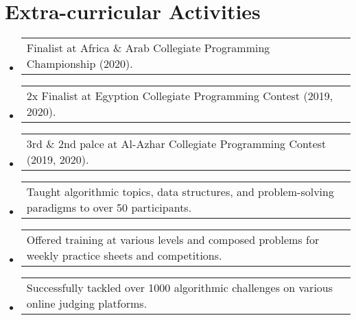 \documentclass[letterpaper, 11pt]{article}
\makeatletter
\newcommand{\extracurricularactivity}[3] {
	\vspace{1pt}\item
  \begin{tabular*}{0.97\textwidth}[t]{l@{\extracolsep{\fill}}r}
		#1 & \href{#2}{\color{RoyalBlue}#3} \\
  \end{tabular*}
  \vspace{-4pt}
}
\makeatother
\begin{document}
\section{Extra-curricular Activities}
\begin{itemize}[leftmargin=*]
  \extracurricularactivity
  {Finalist at Africa \& Arab Collegiate Programming Championship (2020).}
  {https://icpc.global/ICPCID/S6R4YNB7PW7D}{\faIcon{link}}

  \extracurricularactivity
  {2x Finalist at Egyption Collegiate Programming Contest (2019, 2020).}
  {}{}

  \extracurricularactivity
  {3rd \& 2nd palce at Al-Azhar Collegiate Programming Contest (2019, 2020).}
  {}{}

  \extracurricularactivity
  {Taught algorithmic topics, data structures, and problem-solving paradigms to over 50 participants.}
  {https://sites.google.com/view/azharicpc/home}{\faIcon{link}}

  \extracurricularactivity
  {Offered training at various levels and composed problems for weekly practice sheets and competitions.}
  {}{}

  \extracurricularactivity
  {Successfully tackled over 1000 algorithmic challenges on various online judging platforms.}
  {}{}
 \end{itemize}

\end{document}
